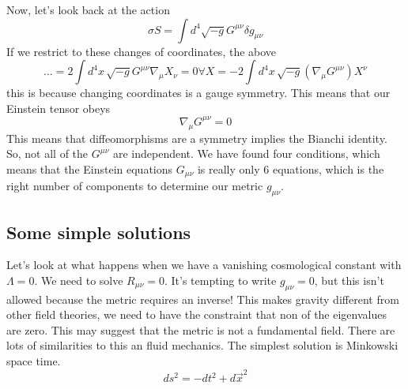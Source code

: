 Now, let's look back at the action
\[
 \sigma S = \int d ^ 4 \sqrt{ -g  }  G ^{ \mu \nu } \delta g _{ \mu \nu }
\] If we restrict to these changes of coordinates, 
the above 
\[
 \dots = 2 \int d ^ 4 x \, \sqrt{ - g }  G ^{ \mu \nu } \nabla _ \mu X _ \nu 
 =0 \forall X  =  -2 \int d ^ 4 x \, \sqrt{ - g }  ( \nabla _ \mu G ^{ \mu \nu } )  X^ \nu 
\]  this is because changing coordinates is a gauge symmetry. 
This means that our Einstein tensor obeys 
\[
 \nabla _ \mu G ^{ \mu \nu }  = 0
\] This means that diffeomorphisms are 
a symmetry implies the Bianchi identity. 
So, not all of the $ G ^{ \mu \nu } $ are independent. 
We have found four conditions, which means that the 
Einstein equations $ G _{ \mu \nu } $ is really only 
6 equations, which is the right number of components 
to determine our metric $ g _{ \mu \nu } $. 

\subsection{Some simple solutions} 
Let's look at what happens when we have a vanishing 
cosmological constant with $ \Lambda  =0 $. 
We need to solve  $ R_{ \mu \nu }  = 0$. 
It's tempting to write $ g _{ \mu \nu } = 0 $, 
but this isn't allowed because the metric requires an inverse! 
This makes gravity different from other field theories, 
we need to have the constraint that non of the eigenvalues are zero. 
This may suggest that the metric is not a fundamental field. There 
are lots of similarities to this an fluid mechanics. 
The simplest solution is Minkowski space time. 
\[
 ds ^ 2 = - d t ^ 2 + d \vec{x} ^ 2 
\] 

